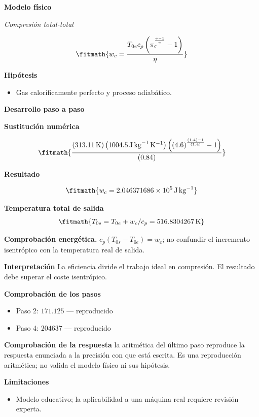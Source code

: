 \documentclass[10pt,openany]{book}
\begin{document}
\noindent\textbf{Modelo físico}

\noindent\textit{Compresión total-total}

\[
\fitmath{w_c=\frac{T_{0e} c_p \left(\pi_c^{\frac{\gamma - 1}{\gamma}} - 1\right)}{\eta}}
\]

\noindent\textbf{Hipótesis}
\begin{itemize}
\item Gas caloríficamente perfecto y proceso adiabático.
\end{itemize}

\noindent\textbf{Desarrollo paso a paso}



\noindent\textbf{Sustitución numérica}

\[
\fitmath{\frac{\left(313.11\,\mathrm{K}\right) \left(1004.5\,\mathrm{J}\,\mathrm{kg}^{-1}\,\mathrm{K}^{-1}\right) \left(\left(4.6\right)^{\frac{\left(1.4\right) - 1}{\left(1.4\right)}} - 1\right)}{\left(0.84\right)}}
\]

\noindent\textbf{Resultado}

\[
\fitmath{w_c=2.046371686\times10^{5}\,\mathrm{J}\,\mathrm{kg}^{-1}}
\]

\noindent\textbf{Temperatura total de salida}
\[
\fitmath{T_{0s}=T_{0e}+w_c/c_p=516.8304267\,\mathrm{K}}
\]

\noindent\textbf{Comprobación energética.} $c_p(T_{0s}-T_{0e})=w_c$; no confundir el incremento isentrópico con la temperatura real de salida.

\noindent\textbf{Interpretación}
La eficiencia divide el trabajo ideal en compresión. El resultado debe superar el coste isentrópico.

\noindent\textbf{Comprobación de los pasos}
\begin{itemize}
\item Paso 2: $171.125$ — reproducido
\item Paso 4: $204637$ — reproducido
\end{itemize}

\noindent\textbf{Comprobación de la respuesta} la aritmética del último paso reproduce la respuesta enunciada a la precisión con que está escrita. Es una reproducción aritmética; no valida el modelo físico ni sus hipótesis.

\noindent\textbf{Limitaciones}
\begin{itemize}
\item Modelo educativo; la aplicabilidad a una máquina real requiere revisión experta.
\end{itemize}
\end{document}
